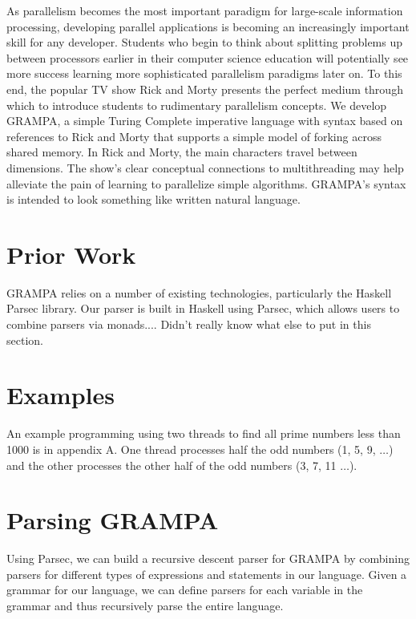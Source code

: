 \documentclass[numbers]{sigplanconf}
\begin{document}
As parallelism becomes the most important paradigm for large-scale information processing, developing parallel applications is becoming an increasingly important skill for any developer. Students who begin to think about splitting problems up between processors earlier in their computer science education will potentially see more success learning more sophisticated parallelism paradigms later on. To this end, the popular TV show Rick and Morty presents the perfect medium through which to introduce students to rudimentary parallelism concepts. We develop GRAMPA, a simple Turing Complete imperative language with syntax based on references to Rick and Morty that supports a simple model of forking across shared memory. In Rick and Morty, the main characters travel between dimensions. The show's clear conceptual connections to multithreading may help alleviate the pain of learning to parallelize simple algorithms. GRAMPA's syntax is intended to look something like written natural language.

\section{Prior Work}

GRAMPA relies on a number of existing technologies, particularly the Haskell Parsec library. Our parser is built in Haskell using Parsec, which allows users to combine parsers via monads.... Didn't really know what else to put in this section.

\section{Examples}
An example programming using two threads to find all prime numbers less than 1000 is in appendix A. One thread processes half the odd numbers (1, 5, 9, $\ldots$) and the other processes the other half of the odd numbers (3, 7, 11 $\ldots$). 

\section{Parsing GRAMPA}

Using Parsec, we can build a recursive descent parser for GRAMPA by combining parsers for different types of expressions and statements in our language. Given a grammar for our language, we can define parsers for each variable in the grammar and thus recursively parse the entire language.
\end{document}
